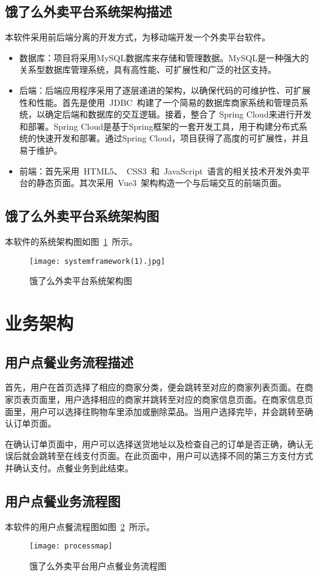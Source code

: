 \subsection{饿了么外卖平台系统架构描述}
本软件采用前后端分离的开发方式，为移动端开发一个外卖平台软件。
\begin{itemize}
    \item {数据库}：项目将采用MySQL数据库来存储和管理数据。MySQL是一种强大的关系型数据库管理系统，具有高性能、可扩展性和广泛的社区支持。
    \item {后端}：后端应用程序采用了逐层递进的架构，以确保代码的可维护性、可扩展性和性能。首先是使用~JDBC~构建了一个简易的数据库商家系统和管理员系统，以确定后端和数据库的交互逻辑。接着，整合了 Spring Cloud来进行开发和部署。Spring Cloud是基于Spring框架的一套开发工具，用于构建分布式系统的快速开发和部署。通过Spring Cloud，项目获得了高度的可扩展性，并且易于维护。
    \item {前端}：首先采用~HTML5、~CSS3~和~JavaScript~语言的相关技术开发外卖平台的静态页面。其次采用~Vue3~架构构造一个与后端交互的前端页面。
\end{itemize}
\subsection{饿了么外卖平台系统架构图}
本软件的系统架构图如图~\ref{fig:systemframework}~所示。
\begin{figure}[htbp]
    \centering
    \texttt{[image: systemframework(1).jpg]}
    \caption{饿了么外卖平台系统架构图}\label{fig:systemframework}
    \vspace{\baselineskip}
\end{figure}

\section{业务架构}
\subsection{用户点餐业务流程描述}
首先，用户在首页选择了相应的商家分类，便会跳转至对应的商家列表页面。在商家页表页面里，用户选择相应的商家并跳转至对应的商家信息页面。在商家信息页面里，用户可以选择往购物车里添加或删除菜品。当用户选择完毕，并会跳转至确认订单页面。

在确认订单页面中，用户可以选择送货地址以及检查自己的订单是否正确，确认无误后就会跳转至在线支付页面。在此页面中，用户可以选择不同的第三方支付方式并确认支付。点餐业务到此结束。
\subsection{用户点餐业务流程图}
本软件的用户点餐流程图如图~\ref{fig:process}~所示。
\begin{figure}[htbp]
    \centering
    \texttt{[image: processmap]}
    \caption{饿了么外卖平台用户点餐业务流程图}\label{fig:process}
    \vspace{\baselineskip}
\end{figure}

